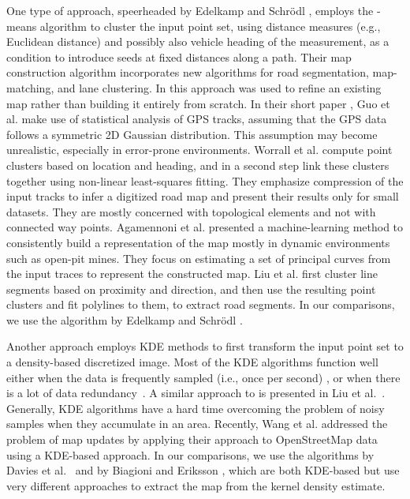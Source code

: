 \documentclass[natbib]{svjour3}                    \smartqed  \usepackage[table]{xcolor}
\begin{document}
One type of approach, speerheaded by Edelkamp and Schr\"odl \cite{edelkamp:2003:rpmi}, employs the -means algorithm to cluster the input point set, using distance measures (e.g., Euclidean distance) and possibly also vehicle heading of the measurement, as a condition to introduce seeds at fixed distances along a path. Their map construction algorithm incorporates new algorithms for road segmentation, map-matching, and lane clustering. In \cite{schroedl:2004:mgtm} this approach was used to refine an existing map rather than building it entirely from scratch. 
In their short paper \cite{DBLP:conf/igarss/GuoIK07}, Guo et al. make use of statistical analysis of GPS tracks, assuming that the GPS data follows a symmetric 2D Gaussian distribution. This assumption may become unrealistic, especially in error-prone environments. Worrall et al. \cite{Worrall:2007:automatedprocess} compute point clusters based on location and heading, and in a second step link these clusters together using non-linear least-squares fitting. They emphasize compression of the input tracks to infer a digitized road map and present their results only for small datasets. They are mostly concerned with topological elements and not with connected way points.
Agamennoni et al. \cite{Agamennoni:2011:RIP:2218592.2218957} presented a 
machine-learning method to consistently build a representation of the map mostly in dynamic environments such as open-pit mines. They focus on estimating a set of principal curves from the input traces to represent the constructed map.
Liu et al. \cite{Liu:2012:MLS:2339530.2339637} first cluster line segments based on proximity and direction, and then use the resulting point clusters and fit polylines to them, to extract road segments. 
In our comparisons, we use the algorithm by Edelkamp and Schr\"odl \cite{edelkamp:2003:rpmi}.

Another approach employs KDE methods to first transform the input point set to a density-based discretized image. Most of the KDE algorithms function well either when the data is frequently sampled (i.e., once per second) \cite{chen:2008:rdmg}, or when there is a lot of data redundancy~\cite{Biagioni:2012:MIF:2424321.2424333, sten:2011:mga, shi:2009:agm, Davies:2006:SDR:1175887.1176088}. A similar approach to \cite{Biagioni:2012:MIF:2424321.2424333} is presented in Liu et al.\ \cite{Liu:2012:MLS:2339530.2339637}.
Generally, KDE algorithms have a hard time overcoming the problem of noisy samples when they accumulate in an area. Recently, Wang et al. \cite{2013:csu:wlw} addressed the problem of map updates by applying their approach to OpenStreetMap data using a KDE-based approach.
In our comparisons, we use the algorithms by Davies et al.\ \cite{Davies:2006:SDR:1175887.1176088} and by Biagioni and Eriksson \cite{Biagioni:2012:MIF:2424321.2424333}, which are both KDE-based but use very different approaches to extract the map from the kernel density estimate.
 
\end{document}
